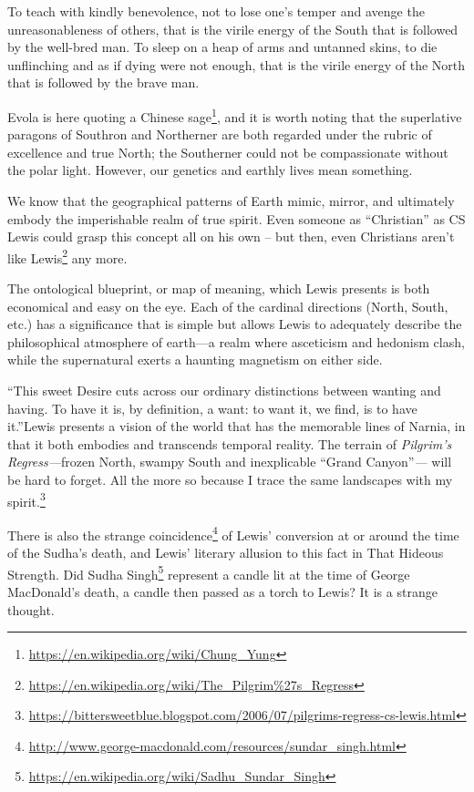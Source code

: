 \begin{quotex}
To teach with kindly benevolence, not to lose one's temper and avenge the unreasonableness of others, that is the virile energy of the South that is followed by the well-bred man. To sleep on a heap of arms and untanned skins, to die unflinching and as if dying were not enough, that is the virile energy of the North that is followed by the brave man.
\end{quotex}


Evola is here quoting a Chinese sage\footnote{\url{https://en.wikipedia.org/wiki/Chung\_Yung}}, and it is worth noting that the superlative paragons of Southron and Northerner are both regarded under the rubric of excellence and true North; the Southerner could not be compassionate without the polar light. However, our genetics and earthly lives mean something.

We know that the geographical patterns of Earth mimic, mirror, and ultimately embody the imperishable realm of true spirit. Even someone as ``Christian'' as CS Lewis could grasp this concept all on his own -- but then, even Christians aren't like Lewis\footnote{\url{https://en.wikipedia.org/wiki/The\_Pilgrim\%27s\_Regress}} any more.

\begin{quotationx}
The ontological blueprint, or map of meaning, which Lewis presents is both economical and easy on the eye. Each of the cardinal directions (North, South, etc.) has a significance that is simple but allows Lewis to adequately describe the philosophical atmosphere of earth---a realm where asceticism and hedonism clash, while the supernatural exerts a haunting magnetism on either side.

``This sweet Desire cuts across our ordinary distinctions between wanting and having. To have it is, by definition, a want: to want it, we find, is to have it.''Lewis presents a vision of the world that has the memorable lines of Narnia, in that it both embodies and transcends temporal reality. The terrain of \emph{Pilgrim's Regress---}frozen North, swampy South and inexplicable ``Grand Canyon''\emph{---} will be hard to forget. All the more so because I trace the same landscapes with my spirit.\footnote{\url{https://bittersweetblue.blogspot.com/2006/07/pilgrims-regress-cs-lewis.html}}
\end{quotationx}

There is also the strange coincidence\footnote{\url{http://www.george-macdonald.com/resources/sundar\_singh.html}} of Lewis' conversion at or around the time of the Sudha's death, and Lewis' literary allusion to this fact in That Hideous Strength. Did Sudha Singh\footnote{\url{https://en.wikipedia.org/wiki/Sadhu\_Sundar\_Singh}} represent a candle lit at the time of George MacDonald's death, a candle then passed as a torch to Lewis? It is a strange thought.

